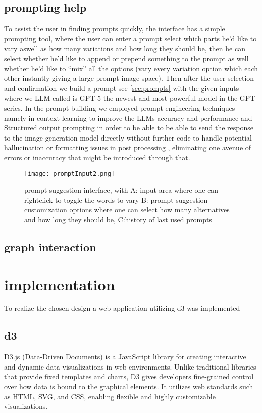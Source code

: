 \documentclass[
  a4paper,  %
  twoside,  %
  bibliography=totoc,
  headsepline,
  cleardoublepage=empty,
  parskip=half,
  draft=false
]{scrbook}
\begin{document}
\section{prompting help}
To assist the user in finding prompts quickly, the interface has a simple prompting tool, where the user can enter a prompt select which parts he'd like to vary aswell as how many variations and how long they should be, then he can select whether he'd like to append or prepend something to the prompt as well whether he'd like to \enquote{mix} all the options (vary every variation option which each other instantly giving a large prompt image space). Then after the user selection and confirmation we build a prompt see \autoref{sec:prompts} with the given inputs where we  LLM called is GPT-5 the newest and most powerful model in the GPT series. In the prompt building we employed prompt engineering techniques namely in-context learning to improve the LLMs accuracy and performance and Structured output prompting in order to be able to be able to send the response to the image generation model directly without further code to handle potential hallucination or formatting issues in post processing \cite{LLMoutputconstraints}, eliminating one avenue of errors or inaccuracy that might be introduced through that. 
\begin{figure}[H]
	\centering
	\texttt{[image: promptInput2.png]}
	\caption{prompt suggestion interface, with A: input area where one can rightclick to toggle the words to vary B: prompt suggestion customization options where one can select how many alternatives and how long they should be, C:history of last used prompts}
	\label{fig:promptInput}
\end{figure}





\section{graph interaction}


\chapter{implementation}
To realize the chosen design a web application utilizing d3 was implemented
\section{d3}
D3.js (Data-Driven Documents) is a JavaScript library for creating interactive and dynamic data visualizations in web environments. Unlike traditional libraries that provide fixed templates and charts, D3 gives developers fine-grained control over how data is bound to the graphical elements. It utilizes web standards such as HTML, SVG, and CSS, enabling flexible and highly customizable visualizations.
\end{document}
